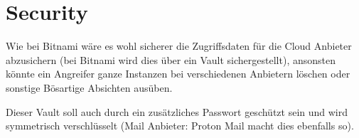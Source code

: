\documentclass[11pt]{scrartcl}
\begin{document}
\section{Security}
Wie bei Bitnami wäre es wohl sicherer die Zugriffsdaten für die Cloud Anbieter 
abzusichern (bei Bitnami wird dies über ein Vault sichergestellt), ansonsten 
könnte ein Angreifer ganze Instanzen bei verschiedenen Anbietern löschen oder 
sonstige Bösartige Absichten ausüben.

Dieser Vault soll auch durch ein zusätzliches Passwort geschützt sein und 
wird symmetrisch verschlüsselt (Mail Anbieter: Proton Mail macht dies ebenfalls 
so).
\end{document}

